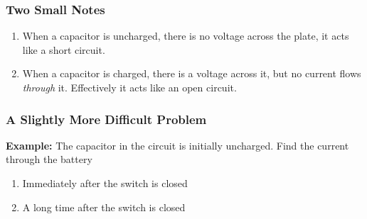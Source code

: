 \documentclass[12pt,aspectratio=169]{beamer}
\begin{document}
\begin{frame}
  \frametitle{Two Small Notes}
  \begin{enumerate}
  \item When a capacitor is uncharged, there is no voltage across the plate,
    it acts like a short circuit.
  \item When a capacitor is charged, there is a voltage across it, but no
    current flows \emph{through} it. Effectively it acts like an open circuit.
  \end{enumerate}
\end{frame}

\begin{frame}
  \frametitle{A Slightly More Difficult Problem}
  \begin{center}
  \end{center}
  \textbf{Example:} The capacitor in the circuit is initially uncharged. Find
  the current through the battery
  \begin{enumerate}
  \item Immediately after the switch is closed
  \item A long time after the switch is closed
  \end{enumerate}
\end{frame}
\end{document}
